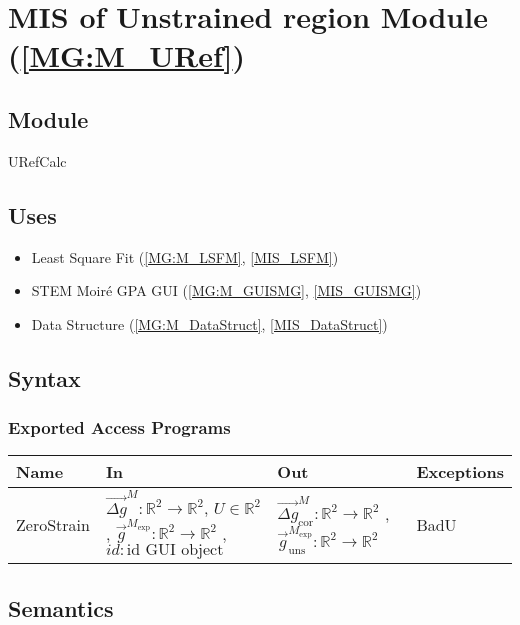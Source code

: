 \documentclass[12pt, titlepage]{article}
\begin{document}
\section{MIS of Unstrained region Module (\texorpdfstring{\cref{MG:M_URef}}))} \label{MIS_URef}

\subsection{Module}
URefCalc
\subsection{Uses}
\begin{itemize}
\item Least Square Fit (\cref{MG:M_LSFM}, \cref{MIS_LSFM})
\item STEM Moir{\'e} GPA GUI (\cref{MG:M_GUISMG}, \cref{MIS_GUISMG})
\item Data Structure (\cref{MG:M_DataStruct}, \cref{MIS_DataStruct})
\end{itemize}

\subsection{Syntax}

\subsubsection{Exported Access Programs}

\begin{center}
\begin{tabular}{p{2cm} p{4cm} p{4cm} p{2cm}}
\hline
\textbf{Name} & \textbf{In} & \textbf{Out} & \textbf{Exceptions} \\
\hline
ZeroStrain & $\overrightarrow{\Delta g}^M:\mathbb{R}^2\rightarrow\mathbb{R}^2$, $U \in \mathbb{R}^2$ , $\overrightarrow{g}^{M_{\text{exp}}}:\mathbb{R}^2\rightarrow\mathbb{R}^2$ , $id : \text{id GUI object}$  & $\overrightarrow{\Delta g}_{\text{cor}}^M:\mathbb{R}^2\rightarrow\mathbb{R}^2$ , $\overrightarrow{g}_{\text{uns}}^{M_{\text{exp}}}:\mathbb{R}^2\rightarrow\mathbb{R}^2$ & BadU \\
\hline
\end{tabular}
\end{center}

\subsection{Semantics}
\end{document}
